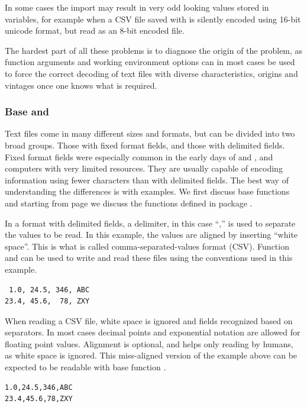 \documentclass[krantz2]{krantz}\usepackage{knitr}%
\begin{document}
\begin{warningbox}
In some cases the import may result in very odd looking values stored in \Rlang variables, for example when a CSV file saved with  is silently encoded using 16-bit unicode format, but read as an 8-bit encoded file.

The hardest part of all these problems is to diagnose the origin of the problem, as function arguments and working environment options can in most cases be used to force the correct decoding of text files with diverse characteristics, origins and vintages once one knows what is required.
\end{warningbox}

\subsubsection[Base R and `utils']{Base \Rlang and }

Text files come in many different sizes and formats, but can be divided into two broad groups. Those with fixed format fields, and those with delimited fields. Fixed format fields were especially common in the early days of  and , and computers with very limited resources. They are usually capable of encoding information using fewer characters than with delimited fields. The best way of understanding the differences is with examples. We first discuss base \Rlang functions and starting from page \pageref{sec:files:readr} we discuss the functions defined in package .

In a format with delimited fields, a delimiter, in this case ``,'' is used to separate the values to be read. In this example, the values are aligned by inserting ``white space''. This is what is called comma-separated-values format (CSV). Function  and  can be used to write and read these files using the conventions used in this example.
\begin{verbatim}
 1.0, 24.5, 346, ABC
23.4, 45.6,  78, ZXY
\end{verbatim}

When reading a CSV file, white space is ignored and fields recognized based on separators. In most cases decimal points and exponential notation are allowed for floating point values. Alignment is optional, and helps only reading by humans, as white space is ignored. This miss-aligned version of the example above can be expected to be readable with base \Rlang function .
\begin{verbatim}
1.0,24.5,346,ABC
23.4,45.6,78,ZXY
\end{verbatim}
\end{document}
